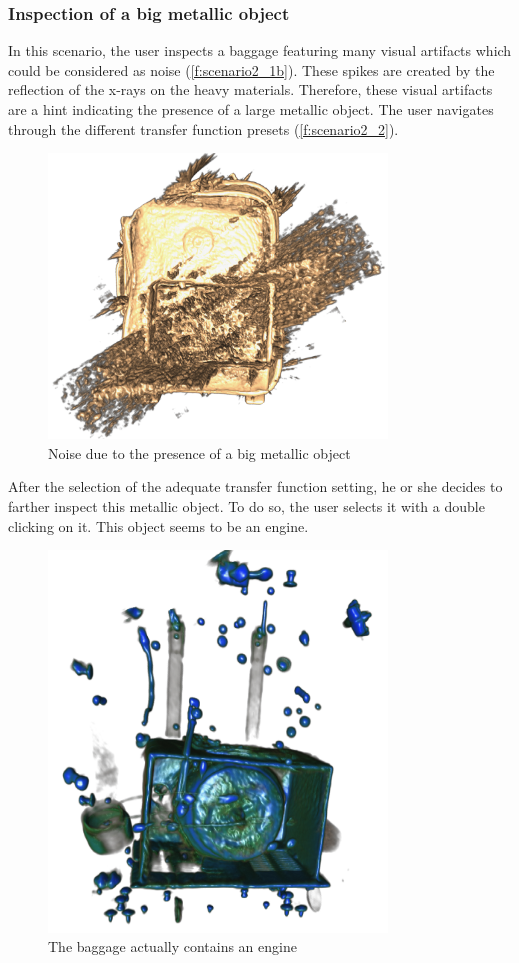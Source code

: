 \subsubsection{Inspection of a big metallic object}

In this scenario, the user inspects a baggage featuring many visual artifacts which could be considered as noise (\autoref{f:scenario2_1b}). These spikes are created by the reflection of the x-rays on the heavy materials. Therefore, these visual artifacts are a hint indicating the presence of a large metallic object. The user navigates through the different transfer function presets (\autoref{f:scenario2_2}).
 
\begin{figure}
\centering
\includegraphics[width=9cm]{Figures/scenario2_1.PNG}
\caption{ Noise due to the presence of a big metallic object }
\label{f:scenario2_1b}
\end{figure}
After the selection of the adequate transfer function setting, he or she decides to farther inspect this metallic object. To do so, the user selects it with a double clicking on it. This object seems to be an engine.
\begin{figure}
\centering
\includegraphics[width=9cm]{Figures/scenario2_2.PNG}
\caption{ The baggage actually contains  an engine }
\label{f:scenario2_2}
\end{figure}

